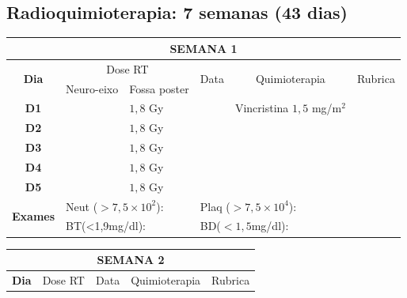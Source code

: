 \documentclass[11pt,a4paper,oldfontcommands]{memoir}
\begin{document}
\hfill \\

\hfill  {}\\

\subsection{Radioquimioterapia: 7 semanas (43 dias)}

\begin{center}
\begin{longtable}{p{1cm}p{2cm}|p{2cm}|p{1cm}|p{4cm}|p{3cm}}
	\hline
	\multicolumn{6}{c}{\textbf{SEMANA 1}}\\
\hline
    \multicolumn{1}{c|}{\multirow{2}{*}{\textbf{Dia}}}&\multicolumn{2}{c|}{Dose RT}&\multicolumn{1}{c|}{\multirow{2}{*}{Data}}&\multicolumn{1}{c|}{\multirow{2}{*}{Quimioterapia}}&\multicolumn{1}{c}{\multirow{2}{*}{Rubrica}} \\
    \cline{2-3}
    \multicolumn{1}{c|}{\multirow{1}{*}{}}&{Neuro-eixo}&{Fossa poster}&& \\
	\hline
	\multicolumn{1}{c|}{\multirow{1}{*}{\textbf{D1}}}&\multicolumn{1}{c|}{}&{\(1,8\) Gy}&&{Vincristina \(1,5\) mg/m\(^2\)}&\\
    \multicolumn{1}{c|}{\multirow{1}{*}{\textbf{D2}}}&\multicolumn{1}{c|}{}&{\(1,8\) Gy}&&{}&\\
    \multicolumn{1}{c|}{\multirow{1}{*}{\textbf{D3}}}&\multicolumn{1}{c|}{}&{\(1,8\) Gy}&&{}&\\
    \multicolumn{1}{c|}{\multirow{1}{*}{\textbf{D4}}}&\multicolumn{1}{c|}{}&{\(1,8\) Gy}&&{}&\\
    \multicolumn{1}{c|}{\multirow{1}{*}{\textbf{D5}}}&\multicolumn{1}{c|}{}&{\(1,8\) Gy}&&{}&\\
    \hline
    \multicolumn{1}{c|}{\multirow{2}{*}{\textbf{Exames}}}&\multicolumn{2}{l|}{Neut (\(>7,5\times10^2\)):}&\multicolumn{2}{l|}{Plaq (\(>7,5\times10^4\)):}&\\
    \cline{2-6}
    \multicolumn{1}{c|}{\multirow{2}{*}{{}}}&\multicolumn{2}{l|}{BT(<1,9mg/dl):}&\multicolumn{2}{l|}{BD(\(<1,5\)mg/dl):}&
    \\
    \hline
\end{longtable}
\clearpage
\begin{longtable}{p{1cm}p{2cm}|p{2cm}|p{1cm}|p{4cm}|p{3cm}}
	\hline
	\multicolumn{6}{c}{\textbf{SEMANA 2}}\\
\hline
    \multicolumn{1}{c|}{\multirow{2}{*}{\textbf{Dia}}}&\multicolumn{2}{c|}{Dose RT}&\multicolumn{1}{c|}{\multirow{2}{*}{Data}}&\multicolumn{1}{c|}{\multirow{2}{*}{Quimioterapia}}&\multicolumn{1}{c}{\multirow{2}{*}{Rubrica}} \\

\end{longtable}
\end{center}
\end{document}

